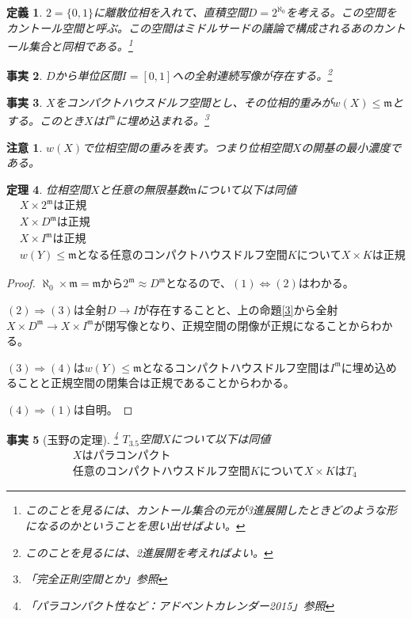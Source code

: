 \documentclass[leqno]{jsarticle}
\newtheorem{thm}{定理}
\newtheorem{df}[thm]{定義}
\newtheorem{fact}[thm]{事実}
\newtheorem*{cau}{注意}
\newcommand{\To}{\Longrightarrow}
\newcommand{\m}{\mathfrak{m}}
\begin{document}
\begin{df}\label{4}
$2=\{0,1\}$に離散位相を入れて、直積空間$D=2^{\aleph_0}$を考える。この空間をカントール空間と呼ぶ。この空間はミドルサードの議論で構成されるあのカントール集合と同相である。\footnote{このことを見るには、カントール集合の元が3進展開したときどのような形になるのかということを思い出せばよい。}
\end{df}

\begin{fact}\label{5}
$D$から単位区間$I=[0,1]$への全射連続写像が存在する。\footnote{このことを見るには、2進展開を考えればよい。}
\end{fact}

\begin{fact}\label{6}
$X$をコンパクトハウスドルフ空間とし、その位相的重みが$w(X)\le\mathfrak{m}$とする。このとき$X$は$I^{\mathfrak{m}}$に埋め込まれる。\footnote{「完全正則空間とか」参照}
\end{fact}
\begin{cau}
$w(X)$で位相空間の重みを表す。つまり位相空間$X$の開基の最小濃度である。
\end{cau}

\begin{thm}\label{7}
位相空間$X$と任意の無限基数$\mathfrak{m}$について以下は同値
\begin{eqnarray}
&X\times 2^{\m}は正規\\ 
&X\times D^{\m}は正規\\ 
&X\times I^{\m}は正規\\ 
&w(Y)\le \m となる任意のコンパクトハウスドルフ空間KについてX\times K は正規
\end{eqnarray}
\end{thm}
\begin{proof}
$\aleph_0\times \m=\m$から$2^{\m}\approx D^{\m}$となるので、$(1)\iff(2)$はわかる。\par
$(2)\To(3)$は全射$D\to I$が存在することと、上の命題\ref{3}から全射$X\times D^{\m}\to X\times I^{\m}$が閉写像となり、正規空間の閉像が正規になることからわかる。\par
$(3)\To (4)$は$w(Y)\le \m$となるコンパクトハウスドルフ空間は$I^{\m}$に埋め込めることと正規空間の閉集合は正規であることからわかる。\par
$(4)\To(1)$は自明。
\end{proof}


\begin{fact}[玉野の定理]\label{tam}\footnote{「パラコンパクト性など：アドベントカレンダー2015」参照}
$T_{3.5}$空間$X$について以下は同値
\begin{eqnarray}
&&Xはパラコンパクト\\
&&任意のコンパクトハウスドルフ空間KについてX\times KはT_4
\end{eqnarray}
\end{fact}
\end{document}
